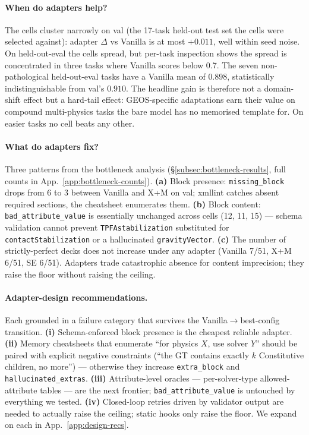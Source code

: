 \documentclass{article}
\begin{document}
\paragraph{When do adapters help?}
The cells cluster narrowly on val (the 17-task held-out test set the cells were selected against): adapter $\Delta$ vs Vanilla is at most $+0.011$, well within seed noise. On held-out-eval the cells spread, but per-task inspection shows the spread is concentrated in three tasks where Vanilla scores below 0.7. The seven non-pathological held-out-eval tasks have a Vanilla mean of $0.898$, statistically indistinguishable from val's $0.910$. The headline gain is therefore not a domain-shift effect but a hard-tail effect: GEOS-specific adaptations earn their value on compound multi-physics tasks the bare model has no memorised template for. On easier tasks no cell beats any other.

\paragraph{What do adapters fix?}
Three patterns from the bottleneck analysis (\S\ref{subsec:bottleneck-results}, full counts in App.~\ref{app:bottleneck-counts}). \textbf{(a)} Block presence: \texttt{missing\_block} drops from 6 to 3 between Vanilla and X+M on val; xmllint catches absent required sections, the cheatsheet enumerates them. \textbf{(b)} Block content: \texttt{bad\_attribute\_value} is essentially unchanged across cells (12, 11, 15) --- schema validation cannot prevent \texttt{TPFAstabilization} substituted for \texttt{contactStabilization} or a hallucinated \texttt{gravityVector}. \textbf{(c)} The number of strictly-perfect decks does not increase under any adapter (Vanilla 7/51, X+M 6/51, SE 6/51). Adapters trade catastrophic absence for content imprecision; they raise the floor without raising the ceiling.

\paragraph{Adapter-design recommendations.}
Each grounded in a failure category that survives the Vanilla$\to$best-config transition. \textbf{(i)} Schema-enforced block presence is the cheapest reliable adapter. \textbf{(ii)} Memory cheatsheets that enumerate ``for physics $X$, use solver $Y$'' should be paired with explicit negative constraints (``the GT contains exactly $k$ Constitutive children, no more'') --- otherwise they increase \texttt{extra\_block} and \texttt{hallucinated\_extras}. \textbf{(iii)} Attribute-level oracles --- per-solver-type allowed-attribute tables --- are the next frontier; \texttt{bad\_attribute\_value} is untouched by everything we tested. \textbf{(iv)} Closed-loop retries driven by validator output are needed to actually raise the ceiling; static hooks only raise the floor. We expand on each in App.~\ref{app:design-recs}.
\end{document}
